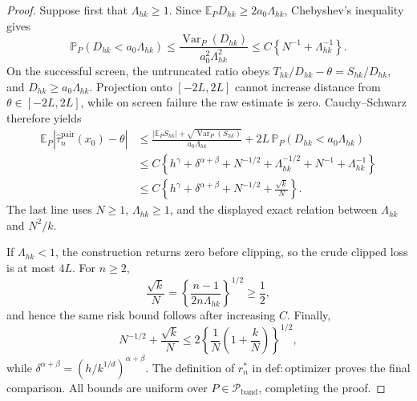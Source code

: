\documentclass{article}
\begin{document}
\begin{proof}
Suppose first that \(\Lambda_{hk}\geq1\).  Since \(\mathbb E_P D_{hk}\geq2a_0\Lambda_{hk}\), Chebyshev's inequality gives
\[
 \mathbb P_P(D_{hk}<a_0\Lambda_{hk})
 \leq\frac{\operatorname{Var}_P(D_{hk})}{a_0^2\Lambda_{hk}^2}
 \leq C\left\{N^{-1}+\Lambda_{hk}^{-1}\right\}.
\]
On the successful screen, the untruncated ratio obeys
\(T_{hk}/D_{hk}-\theta=S_{hk}/D_{hk}\), and \(D_{hk}\geq a_0\Lambda_{hk}\).  Projection onto \([-2L,2L]\) cannot increase distance from \(\theta\in[-2L,2L]\), while on screen failure the raw estimate is zero.  Cauchy--Schwarz therefore yields
\[
\begin{split}
 \mathbb E_P\left|\widehat\tau_n^{\mathrm{pair}}(x_0)-\theta\right|
 &\leq \frac{|\mathbb E_P S_{hk}|+\sqrt{\operatorname{Var}_P(S_{hk})}}{a_0\Lambda_{hk}}
       +2L\,\mathbb P_P(D_{hk}<a_0\Lambda_{hk})\\
 &\leq C\left\{h^\gamma+\delta^{\alpha+\beta}+N^{-1/2}+\Lambda_{hk}^{-1/2}
       +N^{-1}+\Lambda_{hk}^{-1}\right\}\\
 &\leq C\left\{h^\gamma+\delta^{\alpha+\beta}+N^{-1/2}+\frac{\sqrt{k}}{N}\right\}.
\end{split}
\]
The last line uses \(N\geq1\), \(\Lambda_{hk}\geq1\), and the displayed exact relation between \(\Lambda_{hk}\) and \(N^2/k\).

If \(\Lambda_{hk}<1\), the construction returns zero before clipping, so the crude clipped loss is at most \(4L\).  For \(n\geq2\),
\[
 \frac{\sqrt{k}}{N}
 =\left\{\frac{n-1}{2n\Lambda_{hk}}\right\}^{1/2}
 \geq\frac12,
\]
and hence the same risk bound follows after increasing \(C\).  Finally,
\[
 N^{-1/2}+\frac{\sqrt{k}}{N}
 \leq2\left\{\frac1N\left(1+\frac{k}{N}\right)\right\}^{1/2},
\]
while \(\delta^{\alpha+\beta}=(h/k^{1/d})^{\alpha+\beta}\).  The definition of \(r_n^*\) in \(\mathrm{def:optimizer}\) proves the final comparison.  All bounds are uniform over \(P\in\mathcal P_{\mathrm{band}}\), completing the proof.
\end{proof}
\end{document}
